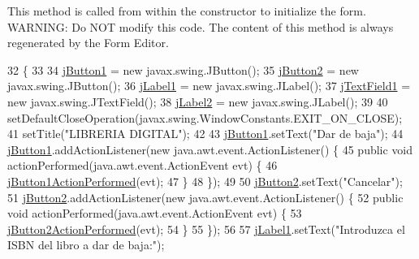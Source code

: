 This method is called from within the constructor to initialize the form. W\+A\+R\+N\+I\+NG\+: Do N\+OT modify this code. The content of this method is always regenerated by the Form Editor. 
\begin{DoxyCode}
32                                   \{
33 
34         \mbox{\hyperlink{class_interfaz_package_1_1_baja_libro_ad62adfcc532334f669bfaf40af59fa81}{jButton1}} = \textcolor{keyword}{new} javax.swing.JButton();
35         \mbox{\hyperlink{class_interfaz_package_1_1_baja_libro_a2da0b911c31a5ee87f05b4a630fa5b2d}{jButton2}} = \textcolor{keyword}{new} javax.swing.JButton();
36         \mbox{\hyperlink{class_interfaz_package_1_1_baja_libro_ae5a57149ebdb3f8259cd7f0bee7684c4}{jLabel1}} = \textcolor{keyword}{new} javax.swing.JLabel();
37         \mbox{\hyperlink{class_interfaz_package_1_1_baja_libro_a2b033ca044fbf57e3ee123d55b137e31}{jTextField1}} = \textcolor{keyword}{new} javax.swing.JTextField();
38         \mbox{\hyperlink{class_interfaz_package_1_1_baja_libro_a6338f6b6d9f81c8b561ffeaa3e70b42d}{jLabel2}} = \textcolor{keyword}{new} javax.swing.JLabel();
39 
40         setDefaultCloseOperation(javax.swing.WindowConstants.EXIT\_ON\_CLOSE);
41         setTitle(\textcolor{stringliteral}{"LIBRERIA DIGITAL"});
42 
43         \mbox{\hyperlink{class_interfaz_package_1_1_baja_libro_ad62adfcc532334f669bfaf40af59fa81}{jButton1}}.setText(\textcolor{stringliteral}{"Dar de baja"});
44         \mbox{\hyperlink{class_interfaz_package_1_1_baja_libro_ad62adfcc532334f669bfaf40af59fa81}{jButton1}}.addActionListener(\textcolor{keyword}{new} java.awt.event.ActionListener() \{
45             \textcolor{keyword}{public} \textcolor{keywordtype}{void} actionPerformed(java.awt.event.ActionEvent evt) \{
46                 \mbox{\hyperlink{class_interfaz_package_1_1_baja_libro_af574e4504923035ec61a72af0a5885ab}{jButton1ActionPerformed}}(evt);
47             \}
48         \});
49 
50         \mbox{\hyperlink{class_interfaz_package_1_1_baja_libro_a2da0b911c31a5ee87f05b4a630fa5b2d}{jButton2}}.setText(\textcolor{stringliteral}{"Cancelar"});
51         \mbox{\hyperlink{class_interfaz_package_1_1_baja_libro_a2da0b911c31a5ee87f05b4a630fa5b2d}{jButton2}}.addActionListener(\textcolor{keyword}{new} java.awt.event.ActionListener() \{
52             \textcolor{keyword}{public} \textcolor{keywordtype}{void} actionPerformed(java.awt.event.ActionEvent evt) \{
53                 \mbox{\hyperlink{class_interfaz_package_1_1_baja_libro_a52b4bc390d2eed69360ad1c46161f230}{jButton2ActionPerformed}}(evt);
54             \}
55         \});
56 
57         \mbox{\hyperlink{class_interfaz_package_1_1_baja_libro_ae5a57149ebdb3f8259cd7f0bee7684c4}{jLabel1}}.setText(\textcolor{stringliteral}{"Introduzca el ISBN del libro a dar de baja:"});

\end{DoxyCode}
